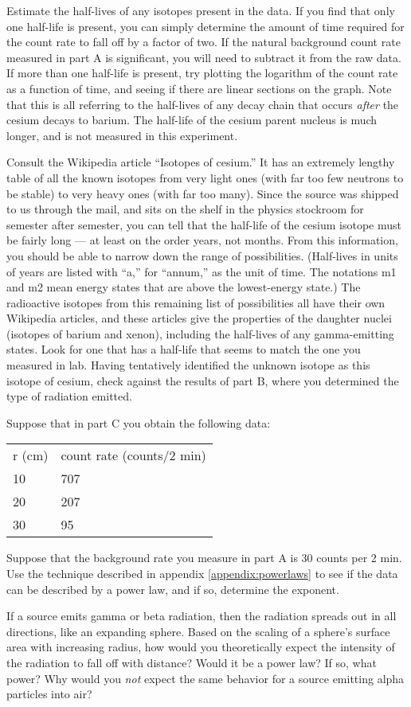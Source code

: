 Estimate the half-lives of any isotopes present in the data. If you find that only one
half-life is present, you can simply determine the 
amount of time required for the count rate to fall off by a factor of two.
If the natural background count rate measured in part A is significant, you will need to subtract it from the raw data.
If more than one half-life is present, try plotting the logarithm of the count rate
as a function of time, and seeing if there are linear sections on the graph.
Note that this is all referring to the half-lives of any decay chain that occurs
\emph{after} the cesium decays to barium. The half-life of the cesium parent
nucleus is much longer, and is not measured in this experiment.

Consult the Wikipedia article ``Isotopes of cesium.'' It has an extremely lengthy
table of all the known isotopes from very light ones (with far too few neutrons to
be stable) to very heavy ones (with far too many). Since the source was shipped to us
through the mail, and sits on the shelf in the physics stockroom for semester after
semester, you can tell that the half-life of the cesium isotope must be fairly long ---
at least on the order years, not months. From this information, you should be able
to narrow down the range of possibilities. (Half-lives in units of years are listed with
``a,'' for ``annum,'' as the unit of time. The notations m1 and m2 mean energy states
that are above the lowest-energy state.) The radioactive isotopes from this remaining
list of possibilities all have their own Wikipedia articles, and these articles give
the properties of the daughter nuclei (isotopes of barium and xenon), including the half-lives
of any gamma-emitting states. Look for one that has a half-life that seems to match
the one you measured in lab. Having tentatively identified the unknown isotope as
this isotope of cesium, check against the results of part B, where you determined
the type of radiation emitted.

\prelab

\prelabquestion
Suppose that in part C you obtain the following data:

\begin{tabular}{ll}
r (cm) & count rate (counts/2 min) \\
10      & 707 \\
20     & 207 \\
30     & 95
\end{tabular}

Suppose that the background rate you measure in part A
is 30 counts per 2 min. Use the technique
described in appendix \ref{appendix:powerlaws} to see if the data can be described
by a power law, and if so, determine the exponent.

\prelabquestion
If a source emits gamma or beta radiation, then the radiation spreads out in all
directions, like an expanding sphere. Based on the scaling of a sphere's surface
area with increasing radius, how would you theoretically expect the
intensity of the radiation to fall off with distance? Would it be a power law?
If so, what power? Why would you \emph{not} expect the same behavior for a source
emitting alpha particles into air?
